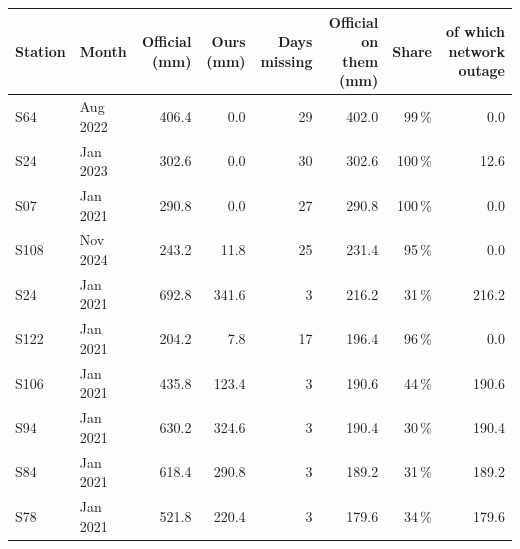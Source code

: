 \begin{tabular}{llrrrrrr}
\toprule
Station & Month & Official (mm) & Ours (mm) & Days missing & Official on them (mm) & Share & of which network outage \\
\midrule
S64 & Aug 2022 & 406.4 & 0.0 & 29 & 402.0 & 99\,\% & 0.0 \\
S24 & Jan 2023 & 302.6 & 0.0 & 30 & 302.6 & 100\,\% & 12.6 \\
S07 & Jan 2021 & 290.8 & 0.0 & 27 & 290.8 & 100\,\% & 0.0 \\
S108 & Nov 2024 & 243.2 & 11.8 & 25 & 231.4 & 95\,\% & 0.0 \\
S24 & Jan 2021 & 692.8 & 341.6 & 3 & 216.2 & 31\,\% & 216.2 \\
S122 & Jan 2021 & 204.2 & 7.8 & 17 & 196.4 & 96\,\% & 0.0 \\
S106 & Jan 2021 & 435.8 & 123.4 & 3 & 190.6 & 44\,\% & 190.6 \\
S94 & Jan 2021 & 630.2 & 324.6 & 3 & 190.4 & 30\,\% & 190.4 \\
S84 & Jan 2021 & 618.4 & 290.8 & 3 & 189.2 & 31\,\% & 189.2 \\
S78 & Jan 2021 & 521.8 & 220.4 & 3 & 179.6 & 34\,\% & 179.6 \\
\bottomrule
\end{tabular}
